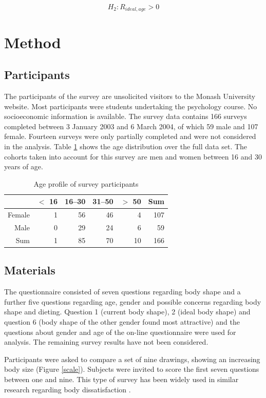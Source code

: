 \documentclass[a4paper, jou, 11pt]{apa6}
\begin{document}
$$H_2: R_{ideal,age} >0$$
\section{Method}
\label{sec:orgc4045cc}
\subsection{Participants}
\label{sec:org4f8bb45}
The participants of the survey are unsolicited visitors to the Monash University website. Most participants were students undertaking the psychology course. No socioeconomic information is available. The survey data contains 166 surveys completed between 3 January 2003 and 6 March 2004, of which 59 male and 107 female. Fourteen surveys were only partially completed and were not considered in the analysis. Table \ref{gender-age} shows the age distribution over the full data set. The cohorts taken into account for this survey are men and women between 16 and 30 years of age. 

\begin{table}[ht]
\centering
\begin{tabular}{rrrrrr}
  \hline
 & $<$ 16 & 16--30 & 31--50 & $>$ 50 & Sum \\ 
  \hline
Female & 1 & 56 & 46 & 4 & 107 \\ 
  Male & 0 & 29 & 24 & 6 & 59 \\ 
  Sum & 1 & 85 & 70 & 10 & 166 \\ 
   \hline
\end{tabular}
\caption{Age profile of survey participants} 
\label{gender-age}
\end{table}

\subsection{Materials}
\label{sec:org3899456}
The questionnaire consisted of seven questions regarding body shape and a further five questions regarding age, gender and possible concerns regarding body shape and dieting. Question 1 (current body shape), 2 (ideal body shape) and question 6 (body shape of the other gender found most attractive) and the questions about gender and age of the on-line questionnaire were used for analysis. The remaining survey results have not been considered.

Participants were asked to compare a set of nine drawings, showing an increasing body size (Figure \ref{scale}). Subjects were invited to score the first seven questions between one and nine. This type of survey has been widely used in similar research regarding body dissatisfaction \cite{abel_relationship_1996,byrne_should_1996,fallon_sex_1985,fear_prevalence_1996,hill_eating_1992,lamb_body_1993,tiggeman_development_1990,tiggeman_body-size_1992}. 
\end{document}
